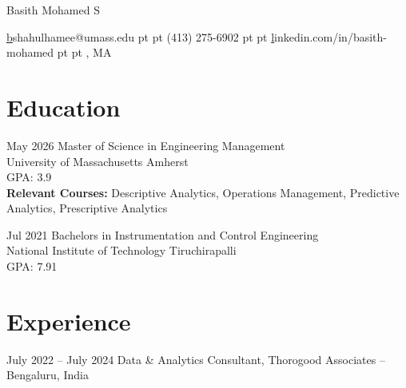 \documentclass[10pt, letterpaper]{article}
\begin{document}
\begin{header}
    \fontsize{25 pt}{25 pt}\selectfont Basith Mohamed S

    \vspace{5 pt}
    \normalsize
    \mbox{\href{mailto:bshahulhamee@umass.edu}bshahulhamee@umass.edu}%
     pt%
    \AND%
     pt%
    \mbox(413) 275-6902%
     pt%
    \AND%
     pt%
    \mbox{\href{https://linkedin.com/in/basith-mohamed}linkedin.com/in/basith-mohamed}%
     pt%
    \AND%
     pt%
    \mboxAmherst, MA%
\end{header}

\vspace{5 pt - 0.3 cm}

\section{Education}

\begin{twocolentry}{ May 2026 }
    Master of Science in Engineering Management \\
    University of Massachusetts Amherst \\
    {\footnotesize GPA: 3.9} \\
    
    {\footnotesize \textbf{Relevant Courses:} Descriptive Analytics, Operations Management, Predictive Analytics, Prescriptive Analytics}
    
\end{twocolentry}
\vspace{0.2cm}

\begin{twocolentry}{ Jul 2021 }
    Bachelors in Instrumentation and Control Engineering \\
    National Institute of Technology Tiruchirapalli \\
    {\footnotesize GPA: 7.91} \\
    
\end{twocolentry}
\vspace{0.2cm}


\section{Experience}

\begin{twocolentry}{ July 2022 -- July 2024 }
    Data & Analytics Consultant, Thorogood Associates -- Bengaluru, India
\end{twocolentry}
\end{document}
